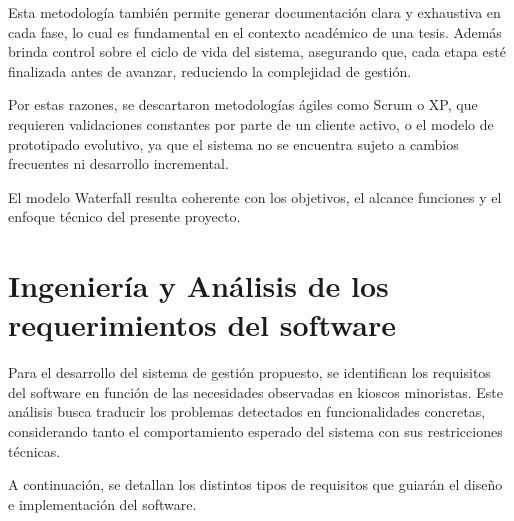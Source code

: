 \documentclass[twoside]{article}
\begin{document}
Esta metodología también permite generar documentación clara y exhaustiva en cada fase, lo cual es fundamental en el contexto académico de una tesis. Además brinda control sobre el ciclo de vida del sistema, asegurando que, cada etapa esté finalizada antes de avanzar, reduciendo la complejidad de gestión.

Por estas razones, se descartaron metodologías ágiles como Scrum o XP, que requieren validaciones constantes por parte de un cliente activo, o el modelo de prototipado evolutivo, ya que el sistema no se encuentra sujeto a cambios frecuentes ni desarrollo incremental.

El modelo Waterfall resulta coherente con los objetivos, el alcance funciones y el enfoque técnico del presente proyecto.



\newpage

\section{Ingeniería y Análisis de los requerimientos del software}
Para el desarrollo del sistema de gestión propuesto, se identifican los requisitos del software en función de las necesidades observadas en kioscos minoristas. Este análisis busca traducir los problemas detectados en funcionalidades concretas, considerando tanto el comportamiento esperado del sistema con sus restricciones técnicas.\par
A continuación, se detallan los distintos tipos de requisitos que guiarán el diseño e implementación del software.
\end{document}

